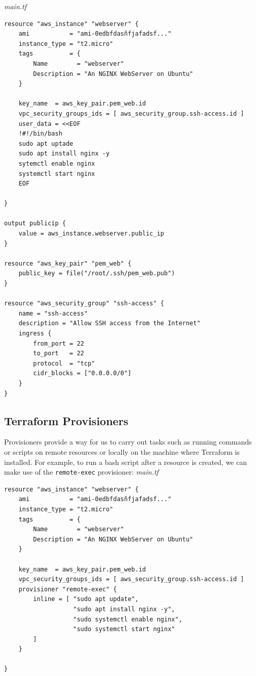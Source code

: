 \documentclass{article}
\newenvironment{codetemplate}[1][]{%
  \mybasecolorbox[#1]
  \itshape
}{%
  \endmybasecolorbox
}
\begin{document}
\begin{codetemplate}{main.tf}
\begin{verbatim}
resource "aws_instance" "webserver" {
    ami           = "ami-0edbfdasñfjafadsf..."
    instance_type = "t2.micro"
    tags          = {
        Name        = "webserver"
        Description = "An NGINX WebServer on Ubuntu"
    }

    key_name  = aws_key_pair.pem_web.id
    vpc_security_groups_ids = [ aws_security_group.ssh-access.id ]
    user_data = <<EOF
    !#!/bin/bash
    sudo apt uptade
    sudo apt install nginx -y
    sytemctl enable nginx
    systemctl start nginx
    EOF

}

output publicip {
    value = aws_instance.webserver.public_ip
}

resource "aws_key_pair" "pem_web" {
    public_key = file("/root/.ssh/pem_web.pub")
}

resource "aws_security_group" "ssh-access" {
    name = "ssh-access"
    description = "Allow SSH access from the Internet"
    ingress {
        from_port = 22
        to_port   = 22
        protocol  = "tcp"
        cidr_blocks = ["0.0.0.0/0"]
    }
}
\end{verbatim}
\end{codetemplate}

\subsection{Terraform Provisioners}
Provisioners provide a way for us to carry out tasks such as running commands or scripts on remote resources or locally on the machine where Terraform is installed. For example, to run a bash script after a resource is created, we can make use of the \verb|remote-exec| provisioner:
\begin{codetemplate}{main.tf}
\begin{verbatim}
resource "aws_instance" "webserver" {
    ami           = "ami-0edbfdasñfjafadsf..."
    instance_type = "t2.micro"
    tags          = {
        Name        = "webserver"
        Description = "An NGINX WebServer on Ubuntu"
    }

    key_name  = aws_key_pair.pem_web.id
    vpc_security_groups_ids = [ aws_security_group.ssh-access.id ]
    provisioner "remote-exec" {
        inline = [ "sudo apt update",
                   "sudo apt install nginx -y",
                   "sudo systemctl enable nginx",
                   "sudo systemctl start nginx"
        ]
    }

}
\end{verbatim}
\end{codetemplate}
\end{document}
